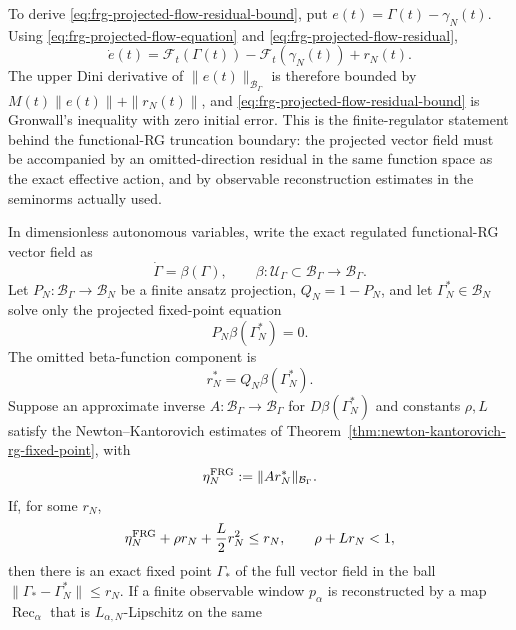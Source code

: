 To derive \eqref{eq:frg-projected-flow-residual-bound}, put
\(e(t)=\Gamma(t)-\gamma_N(t)\).  Using
\eqref{eq:frg-projected-flow-equation} and
\eqref{eq:frg-projected-flow-residual},
\[
  \dot e(t)
  =
  \mathcal F_t(\Gamma(t))-\mathcal F_t(\gamma_N(t))+r_N(t).
\]
The upper Dini derivative of \(\|e(t)\|_{\mathcal B_\Gamma}\) is therefore
bounded by \(M(t)\|e(t)\|+\|r_N(t)\|\), and
\eqref{eq:frg-projected-flow-residual-bound} is Gronwall's inequality with
zero initial error.  This is the finite-regulator statement behind the
functional-RG truncation boundary: the projected vector field must be
accompanied by an omitted-direction residual in the same function space as the
exact effective action, and by observable reconstruction estimates in the
seminorms actually used.

\begin{controlledapproximation}
\label{cap:functional-rg-projected-fixed-point-residual}
In dimensionless autonomous variables, write the exact regulated
functional-RG vector field as
\[
  \dot\Gamma=\beta(\Gamma),
  \qquad
  \beta:\mathcal U_\Gamma\subset\mathcal B_\Gamma\to\mathcal B_\Gamma .
\]
Let \(P_N:\mathcal B_\Gamma\to\mathcal B_N\) be a finite ansatz projection,
\(Q_N=1-P_N\), and let \(\Gamma_N^\ast\in\mathcal B_N\) solve only the
projected fixed-point equation
\begin{equation}
  P_N\beta(\Gamma_N^\ast)=0.
  \label{eq:frg-projected-fixed-point-equation}
\end{equation}
The omitted beta-function component is
\begin{equation}
  r_N^\ast=Q_N\beta(\Gamma_N^\ast).
  \label{eq:frg-projected-fixed-point-residual}
\end{equation}
Suppose an approximate inverse \(A:\mathcal B_\Gamma\to\mathcal B_\Gamma\)
for \(D\beta(\Gamma_N^\ast)\) and constants \(\rho,L\) satisfy the
Newton--Kantorovich estimates of
Theorem~\ref{thm:newton-kantorovich-rg-fixed-point}, with
\[
  \eta_N^{\rm FRG}:=\|A r_N^\ast\|_{\mathcal B_\Gamma}.
\]
If, for some \(r_N\),
\begin{equation}
  \eta_N^{\rm FRG}+\rho r_N+\frac{L}{2}r_N^2\le r_N,
  \qquad
  \rho+Lr_N<1,
  \label{eq:frg-projected-fixed-point-lift}
\end{equation}
then there is an exact fixed point \(\Gamma_\ast\) of the full vector field
in the ball \(\|\Gamma_\ast-\Gamma_N^\ast\|\le r_N\).  If a finite
observable window \(p_\alpha\) is reconstructed by a map
\(\operatorname{Rec}_\alpha\) that is \(L_{\alpha,N}\)-Lipschitz on the same

\end{controlledapproximation}
